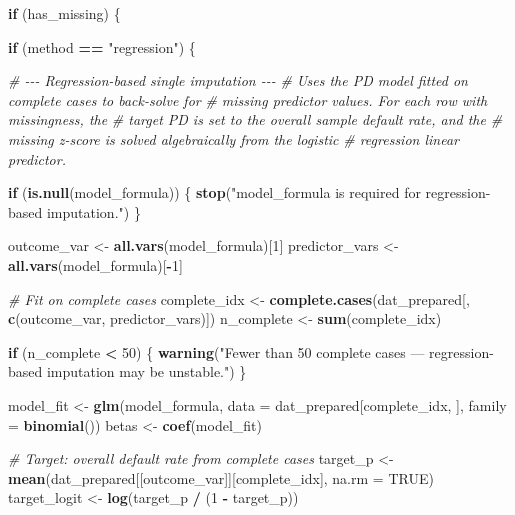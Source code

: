 \documentclass[
]{article}
\newenvironment{Shaded}{\begin{snugshade}}{\end{snugshade}}
\newcommand{\AttributeTok}[1]{\textcolor[rgb]{0.13,0.29,0.53}{#1}}
\newcommand{\CommentTok}[1]{\textcolor[rgb]{0.56,0.35,0.01}{\textit{#1}}}
\newcommand{\ConstantTok}[1]{\textcolor[rgb]{0.56,0.35,0.01}{#1}}
\newcommand{\ControlFlowTok}[1]{\textcolor[rgb]{0.13,0.29,0.53}{\textbf{#1}}}
\newcommand{\DecValTok}[1]{\textcolor[rgb]{0.00,0.00,0.81}{#1}}
\newcommand{\FunctionTok}[1]{\textcolor[rgb]{0.13,0.29,0.53}{\textbf{#1}}}
\newcommand{\NormalTok}[1]{#1}
\newcommand{\OtherTok}[1]{\textcolor[rgb]{0.56,0.35,0.01}{#1}}
\newcommand{\SpecialCharTok}[1]{\textcolor[rgb]{0.81,0.36,0.00}{\textbf{#1}}}
\newcommand{\StringTok}[1]{\textcolor[rgb]{0.31,0.60,0.02}{#1}}
\begin{document}
\begin{Shaded}
\begin{Highlighting}[]
  

  
  \ControlFlowTok{if}\NormalTok{ (has\_missing) \{}
    
    \ControlFlowTok{if}\NormalTok{ (method }\SpecialCharTok{==} \StringTok{"regression"}\NormalTok{) \{}
      
      \CommentTok{\# {-}{-}{-} Regression{-}based single imputation {-}{-}{-}}
      \CommentTok{\# Uses the PD model fitted on complete cases to back{-}solve for}
      \CommentTok{\# missing predictor values. For each row with missingness, the}
      \CommentTok{\# target PD is set to the overall sample default rate, and the}
      \CommentTok{\# missing z{-}score is solved algebraically from the logistic}
      \CommentTok{\# regression linear predictor.}
      
      \ControlFlowTok{if}\NormalTok{ (}\FunctionTok{is.null}\NormalTok{(model\_formula)) \{}
        \FunctionTok{stop}\NormalTok{(}\StringTok{"model\_formula is required for regression{-}based imputation."}\NormalTok{)}
\NormalTok{      \}}
      
\NormalTok{      outcome\_var }\OtherTok{\textless{}{-}} \FunctionTok{all.vars}\NormalTok{(model\_formula)[}\DecValTok{1}\NormalTok{]}
\NormalTok{      predictor\_vars }\OtherTok{\textless{}{-}} \FunctionTok{all.vars}\NormalTok{(model\_formula)[}\SpecialCharTok{{-}}\DecValTok{1}\NormalTok{]}
      
      \CommentTok{\# Fit on complete cases}
\NormalTok{      complete\_idx }\OtherTok{\textless{}{-}} \FunctionTok{complete.cases}\NormalTok{(dat\_prepared[, }\FunctionTok{c}\NormalTok{(outcome\_var, predictor\_vars)])}
\NormalTok{      n\_complete }\OtherTok{\textless{}{-}} \FunctionTok{sum}\NormalTok{(complete\_idx)}
      
      \ControlFlowTok{if}\NormalTok{ (n\_complete }\SpecialCharTok{\textless{}} \DecValTok{50}\NormalTok{) \{}
        \FunctionTok{warning}\NormalTok{(}\StringTok{"Fewer than 50 complete cases — regression{-}based imputation may be unstable."}\NormalTok{)}
\NormalTok{      \}}
      
\NormalTok{      model\_fit }\OtherTok{\textless{}{-}} \FunctionTok{glm}\NormalTok{(model\_formula, }\AttributeTok{data =}\NormalTok{ dat\_prepared[complete\_idx, ],}
                        \AttributeTok{family =} \FunctionTok{binomial}\NormalTok{())}
\NormalTok{      betas }\OtherTok{\textless{}{-}} \FunctionTok{coef}\NormalTok{(model\_fit)}
      
      \CommentTok{\# Target: overall default rate from complete cases}
\NormalTok{      target\_p }\OtherTok{\textless{}{-}} \FunctionTok{mean}\NormalTok{(dat\_prepared[[outcome\_var]][complete\_idx], }\AttributeTok{na.rm =} \ConstantTok{TRUE}\NormalTok{)}
\NormalTok{      target\_logit }\OtherTok{\textless{}{-}} \FunctionTok{log}\NormalTok{(target\_p }\SpecialCharTok{/}\NormalTok{ (}\DecValTok{1} \SpecialCharTok{{-}}\NormalTok{ target\_p))}
      

\end{Highlighting}
\end{Shaded}
\end{document}
